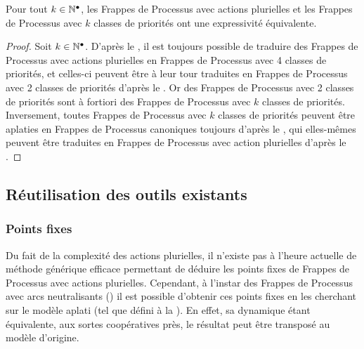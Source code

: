 \begin{theorem}[Équivalence]
  Pour tout $k \in \mathbb{N}^\bullet$,
  les Frappes de Processus avec actions plurielles
  et les Frappes de Processus avec $k$ classes de priorités
  ont une expressivité équivalente.
\end{theorem}

\begin{proof}
  Soit $k \in \mathbb{N}^\bullet$.
  D'après le , il est toujours possible de traduire
  des Frappes de Processus avec actions plurielles en Frappes de Processus
  avec 4 classes de priorités,
  et celles-ci peuvent être à leur tour traduites en
  Frappes de Processus avec 2 classes de priorités
  d'après le .
  Or des Frappes de Processus avec 2 classes de priorités sont
  à fortiori des Frappes de Processus avec $k$ classes de priorités.
  Inversement, toutes Frappes de Processus avec $k$ classes de priorités
  peuvent être aplaties en Frappes de Processus canoniques toujours
  d'après le ,
  qui elles-mêmes peuvent être traduites en Frappes de Processus avec action plurielles
  d'après le .
\end{proof}



\subsection{Réutilisation des outils existants}



\subsubsection{Points fixes}

Du fait de la complexité des actions plurielles, il n'existe pas à l'heure actuelle de méthode
générique efficace permettant de déduire les points fixes de Frappes de Processus avec
actions plurielles.
Cependant, à l'instar des Frappes de Processus avec arcs neutralisants
()
il est possible d'obtenir ces points fixes en les cherchant sur
le modèle aplati (tel que défini à la ).
En effet, sa dynamique étant équivalente, aux sortes coopératives près, le résultat
peut être transposé au modèle d'origine.

